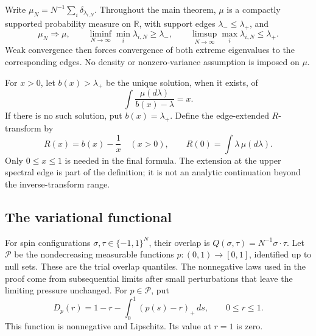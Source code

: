 \documentclass[11pt]{article}
\theoremstyle{definition}
\theoremstyle{remark}
\numberwithin{equation}{section}
\newcommand{\R}{\mathbb R}
\newcommand{\cP}{\mathcal P}
\begin{document}
Write $\mu_N=N^{-1}\sum_i\delta_{\lambda_{i,N}}$. Throughout the main
theorem, $\mu$ is a compactly supported probability measure on $\R$, with
support edges $\lambda_-\le\lambda_+$, and
\begin{equation}
 \mu_N\Rightarrow\mu,\qquad
 \liminf_{N\to\infty}\min_i\lambda_{i,N}\ge\lambda_-,\qquad
 \limsup_{N\to\infty}\max_i\lambda_{i,N}\le\lambda_+.
 \label{eq:spectral-assumptions}
\end{equation}
Weak convergence then forces convergence of both extreme eigenvalues to
the corresponding edges. No density or nonzero-variance assumption is
imposed on $\mu$.

For $x>0$, let $b(x)>\lambda_+$ be the unique solution, when it exists, of
\begin{equation}
 \int\frac{\mu(d\lambda)}{b(x)-\lambda}=x.
 \label{eq:resolvent}
\end{equation}
If there is no such solution, put $b(x)=\lambda_+$. Define the
edge-extended $R$-transform by
\begin{equation}
 R(x)=b(x)-\frac1x\quad(x>0),\qquad
 R(0)=\int\lambda\,\mu(d\lambda).
 \label{eq:R}
\end{equation}
Only $0\le x\le1$ is needed in the final formula. The extension at the
upper spectral edge is part of the definition; it is not an analytic
continuation beyond the inverse-transform range.

\subsection{The variational functional}

For spin configurations $\sigma,\tau\in\{-1,1\}^N$, their overlap is
$Q(\sigma,\tau)=N^{-1}\sigma\cdot\tau$.
Let $\cP$ be the nondecreasing measurable functions
$p:(0,1)\to[0,1]$, identified up to null sets. These are the trial
overlap quantiles. The nonnegative laws used in the proof come from
subsequential limits after small perturbations that leave the limiting
pressure unchanged.
For $p\in\cP$, put
\begin{equation}
 D_p(r)=1-r-\int_0^1(p(s)-r)_+\,ds,\qquad 0\le r\le1.
 \label{eq:D}
\end{equation}
This function is nonnegative and Lipschitz. Its value at $r=1$ is zero.
\end{document}
